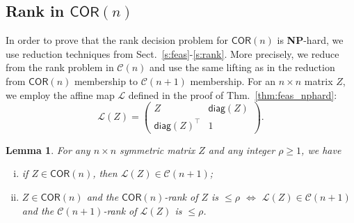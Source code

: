 \documentclass[envcountsect,envcountsame]{svjour3}
\theoremstyle{changebreak}                %
\newtheorem{lemma}[result]{Lemma}
\newcommand{\transpose}[1]{{#1}^{\top}}
\newcommand{\COR}[1]{\mathsf{COR}(#1)}
\newcommand{\CONX}[1]{\mathcal{C}(#1)}
\newcommand{\diag}[1]{\mathsf{diag}(#1)}
\begin{document}
\subsection{Rank in $\COR{n}$}
\label{s:corrank}
In order to prove that the rank decision problem for $\COR{n}$ is \textbf{NP}-hard, we use reduction techniques from Sect.~\ref{s:feas}-\ref{s:rank}. More precisely, we reduce from the rank problem in $\CONX{n}$ and use the same lifting as in the reduction from $\COR{n}$ membership to $\CONX{n+1}$ membership. For an $n\times n$ matrix $Z$, we employ the affine map $\mathscr{L}$ defined in the proof of Thm.~\ref{thm:feas_nphard}:
\[\mathscr{L}(Z) = \left(\begin{array}{cc} Z & \diag{Z} \\ \transpose{\diag{Z}} & 1\end{array}\right).\]
  \begin{lemma}
    \label{lem:ZL}
For any $n\times n$ symmetric matrix $Z$ and any integer $\rho\ge 1$, we have
\begin{enumerate}[(i)]
\item if $Z\in\COR{n}$, then $\mathscr{L}(Z)\in\CONX{n+1}$;
\item  $Z\in\COR{n}$ and the $\COR{n}$-rank of $Z$ is $\le\rho$ $\Longleftrightarrow$ $\mathscr{L}(Z)\in\CONX{n+1}$ and the $\CONX{n+1}$-rank of $\mathscr{L}(Z)$ is $\le\rho$.
\end{enumerate}
\end{lemma}
\end{document}

